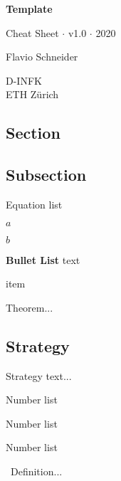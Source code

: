 \documentclass[8pt,a4paper]{extarticle}     %
\begin{document}
\begin{titlepage}
    \begin{center}
		\vspace*{1cm}
		
		\Huge
        \textbf{Template}
        
		\vspace{0.5cm}
		\Large
        Cheat Sheet $\cdot$ v1.0 $\cdot$ 2020
        
        \vfill
        
        Flavio Schneider
        
		\vspace{0.8cm}
		
        D-INFK\\
        ETH Zürich       
    \end{center}
\end{titlepage}

\begin{multicols}{4}
\setcounter{page}{1}


\section{Section}
\subsection{Subsection}
\begin{eqlist}
    \item[] Equation list
	\item $a$
	\item $b$
\end{eqlist}

\begin{bulletlist}
	\item \textbf{Bullet List} text
	\item item 
	\item 
\end{bulletlist}

\begin{boxtheorem}[Theorem]
    Theorem...
\end{boxtheorem}
\subsection{Strategy}
Strategy text...
\begin{numberlist}
	\item Number list
	\item Number list
	\item Number list
\end{numberlist}

\begin{boxdefinition}[Name]
	\
	Definition...
\end{boxdefinition}

\vfill\eject
\columnbreak

\end{multicols}
\end{document}
